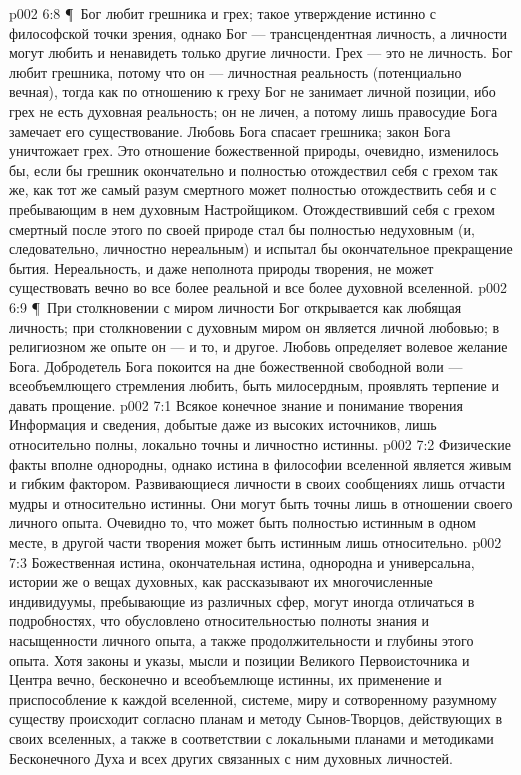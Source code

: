 \vs p002 6:8 \P\ Бог любит грешника и  грех; такое утверждение истинно с философской точки зрения, однако Бог --- трансцендентная личность, а личности могут любить и ненавидеть только другие личности. Грех --- это не личность. Бог любит грешника, потому что он --- личностная реальность (потенциально вечная), тогда как по отношению к греху Бог не занимает личной позиции, ибо грех не есть духовная реальность; он не личен, а потому лишь правосудие Бога замечает его существование. Любовь Бога спасает грешника; закон Бога уничтожает грех. Это отношение божественной природы, очевидно, изменилось бы, если бы грешник окончательно и полностью отождествил себя с грехом так же, как тот же самый разум смертного может полностью отождествить себя и с пребывающим в нем духовным Настройщиком. Отождествивший себя с грехом смертный после этого по своей природе стал бы полностью недуховным (и, следовательно, личностно нереальным) и испытал бы окончательное прекращение бытия. Нереальность, и даже неполнота природы творения, не может существовать вечно во все более реальной и все более духовной вселенной.
\vs p002 6:9 \P\ При столкновении с миром личности Бог открывается как любящая личность; при столкновении с духовным миром он является личной любовью; в религиозном же опыте он --- и то, и другое. Любовь определяет волевое желание Бога. Добродетель Бога покоится на дне божественной свободной воли --- всеобъемлющего стремления любить, быть милосердным, проявлять терпение и давать прощение.
\vs p002 7:1 Всякое конечное знание и понимание творения  Информация и сведения, добытые даже из высоких источников, лишь относительно полны, локально точны и личностно истинны.
\vs p002 7:2 Физические факты вполне однородны, однако истина в философии вселенной является живым и гибким фактором. Развивающиеся личности в своих сообщениях лишь отчасти мудры и относительно истинны. Они могут быть точны лишь в отношении своего личного опыта. Очевидно то, что может быть полностью истинным в одном месте, в другой части творения может быть истинным лишь относительно.
\vs p002 7:3 Божественная истина, окончательная истина, однородна и универсальна, истории же о вещах духовных, как рассказывают их многочисленные индивидуумы, пребывающие из различных сфер, могут иногда отличаться в подробностях, что обусловлено относительностью полноты знания и насыщенности личного опыта, а также продолжительности и глубины этого опыта. Хотя законы и указы, мысли и позиции Великого Первоисточника и Центра вечно, бесконечно и всеобъемлюще истинны, их применение и приспособление к каждой вселенной, системе, миру и сотворенному разумному существу происходит согласно планам и методу Сынов\hyp{}Творцов, действующих в своих вселенных, а также в соответствии с локальными планами и методиками Бесконечного Духа и всех других связанных с ним духовных личностей.
